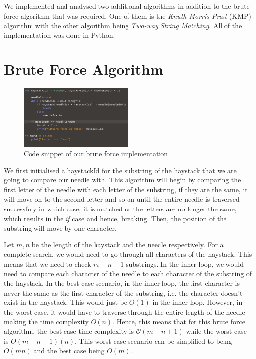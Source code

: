 
We implemented and analysed two additional algorithms in addition to the brute force algorithm that was required. One of them is the \emph{Knuth-Morris-Pratt} (KMP) algorithm with the other algorithm being \emph{Two-way String Matching}. All of the implementation was done in Python.

\section*{Brute Force Algorithm}
\begin{figure}[h!]
    \centering
    \includegraphics[width=0.50\textwidth]{images/brute_force.png}
    \caption{Code snippet of our brute force implementation}
\end{figure}

We first initialised a haystackId for the substring of the haystack that we are going to compare our needle with. This algorithm will begin by comparing the first letter of the needle with each letter of the substring, if they are the same, it will move on to the second letter and so on until the entire needle is traversed successfuly in which case, it is matched or the letters are no longer the same, which results in the \emph{if} case and hence, breaking. Then, the position of the substring will move by one character. 

Let $m, n$ be the length of the haystack and the needle respectively. For a complete search, we would need to go through all characters of the haystack. This means that we need to check $m - n + 1$ substrings. In the inner loop, we would need to compare each character of the needle to each character of the substring of the haystack. In the best case scenario, in the inner loop, the first character is never the same as the first character of the substring, i.e. the character doesn't exist in the haystack. This would just be $O(1)$ in the inner loop. However, in the worst case, it would have to traverse through the entire length of the needle making the time complexity $O(n)$. Hence, this means that for this brute force algorithm, the best case time complexity is $\mathcal{O}(m - n + 1)$ while the worst case is $O(m - n + 1)(n)$. This worst case scenario can be simplified to being $O(mn)$ and the best case being $O(m)$.

